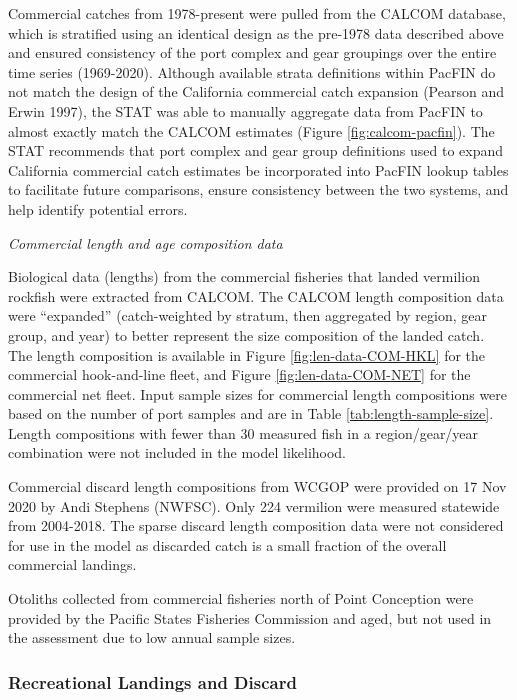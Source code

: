 \documentclass[
  english,
  a4paper,
]{article}
\begin{document}
Commercial catches from 1978-present were pulled from the CALCOM database, which
is stratified using an identical design as the pre-1978 data described above and
ensured consistency of the port complex and gear groupings over the entire time
series (1969-2020). Although available strata definitions within PacFIN do not
match the design of the California commercial catch expansion (Pearson and Erwin 1997),
the STAT was able to manually aggregate data from PacFIN to almost exactly match
the CALCOM estimates (Figure \ref{fig:calcom-pacfin}). The STAT recommends that
port complex and gear group definitions used to expand California commercial
catch estimates be incorporated into PacFIN lookup tables to facilitate future
comparisons, ensure consistency between the two systems, and help identify potential errors.

\emph{Commercial length and age composition data}

Biological data (lengths) from the commercial fisheries that landed vermilion rockfish were
extracted from CALCOM. The CALCOM length composition data were ``expanded''
(catch-weighted by stratum, then aggregated by region, gear group, and year) to
better represent the size composition of the landed catch. The length composition
is available in Figure \ref{fig:len-data-COM-HKL}
for the commercial hook-and-line fleet, and Figure \ref{fig:len-data-COM-NET} for the commercial net fleet. Input sample sizes for
commercial length compositions were based on the number of port samples and are in
Table \ref{tab:length-sample-size}. Length compositions with fewer than 30
measured fish in a region/gear/year combination were not included in the model
likelihood.

Commercial discard length compositions from WCGOP were provided on
17 Nov 2020 by Andi Stephens (NWFSC). Only 224 vermilion were measured statewide from
2004-2018. The sparse discard length composition data were not considered for use in the
model as discarded catch is a small fraction of the overall commercial landings.

Otoliths collected from commercial fisheries north of Point Conception were provided by
the Pacific States Fisheries Commission and aged, but not used in the assessment due
to low annual sample sizes.

\hypertarget{recreational-landings-and-discard}{%
\subsubsection{Recreational Landings and Discard}\label{recreational-landings-and-discard}}
\end{document}
